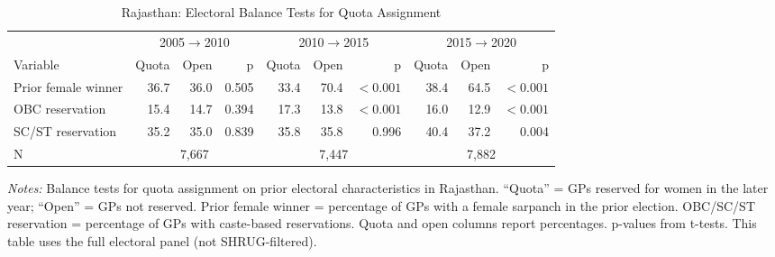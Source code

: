 \begin{table}[htbp]
\caption{Rajasthan: Electoral Balance Tests for Quota Assignment}
\label{tab:balance_electoral_raj}
{\centering\scriptsize
\begin{tabular}{@{}lrrr rrr rrr@{}}
\toprule
& \multicolumn{3}{c}{2005$\rightarrow$2010} & \multicolumn{3}{c}{2010$\rightarrow$2015} & \multicolumn{3}{c}{2015$\rightarrow$2020} \\
\cmidrule(lr){2-4} \cmidrule(lr){5-7} \cmidrule(lr){8-10}
Variable & Quota & Open & p & Quota & Open & p & Quota & Open & p \\
\midrule
Prior female winner & 36.7 & 36.0 & 0.505 & 33.4 & 70.4 & $<0.001$ & 38.4 & 64.5 & $<0.001$ \\
OBC reservation & 15.4 & 14.7 & 0.394 & 17.3 & 13.8 & $<0.001$ & 16.0 & 12.9 & $<0.001$ \\
SC/ST reservation & 35.2 & 35.0 & 0.839 & 35.8 & 35.8 & 0.996 & 40.4 & 37.2 & 0.004 \\
\midrule
N & \multicolumn{3}{c}{7,667} & \multicolumn{3}{c}{7,447} & \multicolumn{3}{c}{7,882} \\
\bottomrule
\end{tabular}
\par}

\vspace{0.5ex}
\parbox{\linewidth}{\scriptsize \emph{Notes:} Balance tests for quota assignment on prior electoral characteristics in Rajasthan. ``Quota'' = GPs reserved for women in the later year; ``Open'' = GPs not reserved. Prior female winner = percentage of GPs with a female sarpanch in the prior election. OBC/SC/ST reservation = percentage of GPs with caste-based reservations. Quota and open columns report percentages. p-values from t-tests. This table uses the full electoral panel (not SHRUG-filtered).}
\end{table}
